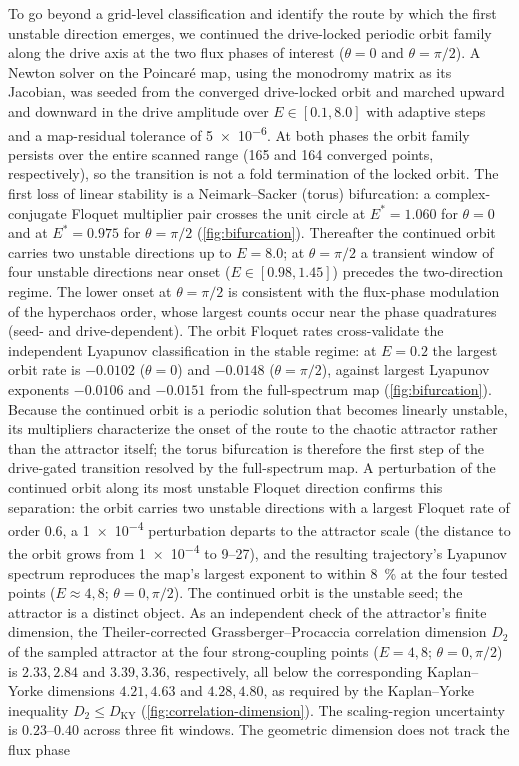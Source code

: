 \documentclass[Phys]{SciPost}
\begin{document}
To go beyond a grid-level classification and identify the route by which the first unstable direction emerges, we continued the drive-locked periodic orbit family along the drive axis at the two flux phases of interest ($\theta=0$ and $\theta=\pi/2$). A Newton solver on the Poincar\'e map, using the monodromy matrix as its Jacobian, was seeded from the converged drive-locked orbit and marched upward and downward in the drive amplitude over $E\in[\num{0.1},\num{8.0}]$ with adaptive steps and a map-residual tolerance of \num{5e-6}. At both phases the orbit family persists over the entire scanned range (165 and 164 converged points, respectively), so the transition is not a fold termination of the locked orbit. The first loss of linear stability is a Neimark--Sacker (torus) bifurcation: a complex-conjugate Floquet multiplier pair crosses the unit circle at $E^{*}=\num{1.060}$ for $\theta=0$ and at $E^{*}=\num{0.975}$ for $\theta=\pi/2$ (\cref{fig:bifurcation}). Thereafter the continued orbit carries two unstable directions up to $E=\num{8.0}$; at $\theta=\pi/2$ a transient window of four unstable directions near onset ($E\in[\num{0.98},\num{1.45}]$) precedes the two-direction regime. The lower onset at $\theta=\pi/2$ is consistent with the flux-phase modulation of the hyperchaos order, whose largest counts occur near the phase quadratures (seed- and drive-dependent). The orbit Floquet rates cross-validate the independent Lyapunov classification in the stable regime: at $E=\num{0.2}$ the largest orbit rate is $-\num{0.0102}$ ($\theta=0$) and $-\num{0.0148}$ ($\theta=\pi/2$), against largest Lyapunov exponents $-\num{0.0106}$ and $-\num{0.0151}$ from the full-spectrum map (\cref{fig:bifurcation}). Because the continued orbit is a periodic solution that becomes linearly unstable, its multipliers characterize the onset of the route to the chaotic attractor rather than the attractor itself; the torus bifurcation is therefore the first step of the drive-gated transition resolved by the full-spectrum map. A perturbation of the continued orbit along its most unstable Floquet direction confirms this separation: the orbit carries two unstable directions with a largest Floquet rate of order \num{0.6}, a \num{1e-4} perturbation departs to the attractor scale (the distance to the orbit grows from \num{1e-4} to \num{9}--\num{27}), and the resulting trajectory's Lyapunov spectrum reproduces the map's largest exponent to within \qty{8}{\percent} at the four tested points ($E\approx\num{4},\num{8}$; $\theta=0,\pi/2$). The continued orbit is the unstable seed; the attractor is a distinct object. As an independent check of the attractor's finite dimension, the Theiler-corrected Grassberger--Procaccia correlation dimension \cite{grassberger1983} $D_2$ of the sampled attractor at the four strong-coupling points ($E=\num{4},\num{8}$; $\theta=0,\pi/2$) is $\num{2.33},\num{2.84}$ and $\num{3.39},\num{3.36}$, respectively, all below the corresponding Kaplan--Yorke dimensions $\num{4.21},\num{4.63}$ and $\num{4.28},\num{4.80}$, as required by the Kaplan--Yorke inequality \cite{kaplan1979,frederickson1983} $D_2\le D_{\mathrm{KY}}$ (\cref{fig:correlation-dimension}). The scaling-region uncertainty is $\num{0.23}$--$\num{0.40}$ across three fit windows. The geometric dimension does not track the flux phase 
\end{document}
